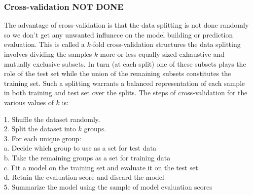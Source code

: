 \subsubsection{Cross-validation NOT DONE}
The advantage of cross-validation is that the data splitting is not done randomly so we don't get any unwanted influnece on the model building or prediction evaluation. This is called a  $k$-fold cross-validation structures the data splitting involves dividing the samples $k$ more or less equally sized exhaustive and
mutually exclusive subsets. In turn (at each split) one of these
subsets plays the role of the test set while the union of the
remaining subsets constitutes the training set. Such a splitting
warrants a balanced representation of each sample in both training and
test set over the splits. The steps of cross-validation for the various values of $k$ is:

\begin{mdframed}[backgroundcolor=black!10]
\raggedright

1. Shuffle the dataset randomly.\\

2. Split the dataset into $k$ groups.\\

3. For each unique group:\\

\hspace{1cm}a. Decide which group to use as a set for test data\\

\hspace{1cm}b. Take the remaining groups as a set for training data\\

\hspace{1cm}c. Fit a model on the training set and evaluate it on the test set\\

\hspace{1cm}d. Retain the evaluation score and discard the model\\

5. Summarize the model using the sample of model evaluation scores\\

\end{mdframed}



